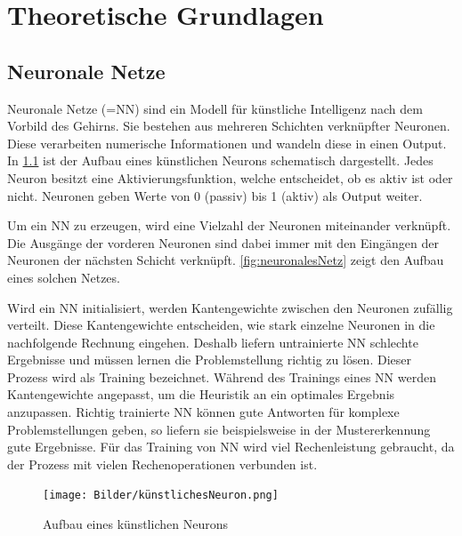 

\clearpage
\chapter{Theoretische Grundlagen}
\section{Neuronale Netze}
Neuronale Netze (=NN) sind ein Modell für künstliche Intelligenz nach dem Vorbild des Gehirns. Sie bestehen aus mehreren Schichten verknüpfter Neuronen. Diese verarbeiten numerische Informationen und wandeln diese in einen Output.  In \ref{fig:künstlichesNeuron} ist der Aufbau eines künstlichen Neurons schematisch dargestellt. Jedes Neuron besitzt eine Aktivierungsfunktion, welche entscheidet, ob es aktiv ist oder nicht. Neuronen geben Werte von 0 (passiv) bis 1 (aktiv) als Output weiter. 

Um ein NN zu erzeugen, wird eine Vielzahl der Neuronen miteinander verknüpft. Die Ausgänge der vorderen Neuronen sind dabei immer mit den Eingängen der Neuronen der nächsten Schicht verknüpft. \ref{fig:neuronalesNetz} zeigt den Aufbau eines solchen Netzes. 

Wird ein NN initialisiert, werden Kantengewichte zwischen den Neuronen zufällig verteilt. Diese Kantengewichte entscheiden, wie stark einzelne Neuronen in die nachfolgende Rechnung eingehen.
Deshalb liefern untrainierte NN schlechte Ergebnisse und müssen lernen die Problemstellung richtig zu lösen. Dieser Prozess wird als Training bezeichnet.
Während des Trainings eines NN werden Kantengewichte angepasst, um die Heuristik  an ein optimales Ergebnis anzupassen. Richtig trainierte NN können gute Antworten für komplexe Problemstellungen geben, so liefern sie beispielsweise in der Mustererkennung gute Ergebnisse.\cite{lorenz_reinforcement_2020}
Für das Training von NN wird viel Rechenleistung gebraucht, da der Prozess mit vielen Rechenoperationen verbunden ist.
\cite{ertel_grundkurs_2021}

\begin{figure}[!htb]
	\centering
	\texttt{[image: Bilder/künstlichesNeuron.png]}
	\caption{Aufbau eines künstlichen Neurons \cite{noauthor_kunstliche_nodate}}
    \label{fig:künstlichesNeuron}
\end{figure}

